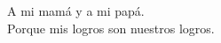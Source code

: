 
\vspace*{3cm}

\begin{center}
    A mi mamá y a mi papá. \\
    Porque mis logros son nuestros logros.
\end{center}

\medskip
